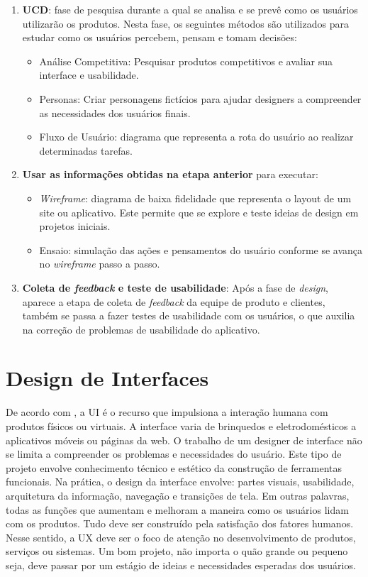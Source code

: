 \begin{enumerate}
    \item \textbf{\ac{UCD}}: fase de pesquisa durante a qual se analisa e se prevê como os usuários utilizarão os produtos. Nesta fase, os seguintes métodos são utilizados para estudar como os usuários percebem, pensam e tomam decisões:
    \begin{itemize}
        \item Análise Competitiva: Pesquisar produtos competitivos e avaliar sua interface e usabilidade. 
        \item Personas: Criar personagens fictícios para ajudar designers a compreender as necessidades dos usuários finais. 
        \item Fluxo de Usuário: diagrama que representa a rota do usuário ao realizar determinadas tarefas. 
    \end{itemize}
   \item \textbf{Usar as informações obtidas na etapa anterior} para executar:
    \begin{itemize}
        \item \textit{Wireframe}: diagrama de baixa fidelidade que representa o layout de um site ou aplicativo. Este permite que se explore e teste ideias de design em projetos iniciais. 
        \item Ensaio: simulação das ações e pensamentos do usuário conforme se avança no \textit{wireframe} passo a passo.
    \end{itemize}
   \item \textbf{Coleta de \textit{feedback} e teste de usabilidade}: Após a fase de \textit{design}, aparece a etapa de coleta de \textit{feedback} da equipe de produto e clientes, também se passa a fazer testes de usabilidade com os usuários, o que auxilia na correção de problemas de usabilidade do aplicativo.
\end{enumerate}

\section{Design de Interfaces}
\label{Design de Interfaces (UI)}

De acordo com , a \acf{UI} é o recurso que impulsiona a interação humana com produtos físicos ou virtuais. A interface varia de brinquedos e eletrodomésticos a aplicativos móveis ou páginas da web. O trabalho de um designer de interface não se limita a compreender os problemas e necessidades do usuário. Este tipo de projeto envolve conhecimento técnico e estético da construção de ferramentas funcionais. Na prática, o design da interface envolve: partes visuais, usabilidade, arquitetura da informação, navegação e transições de tela. Em outras palavras, todas as funções que aumentam e melhoram a maneira como os usuários lidam com os produtos. Tudo deve ser construído pela satisfação dos fatores humanos. Nesse sentido, a \acf{UX} deve ser o foco de atenção no desenvolvimento de produtos, serviços ou sistemas. Um bom projeto, não importa o quão grande ou pequeno seja, deve passar por um estágio de ideias e necessidades esperadas dos usuários.

